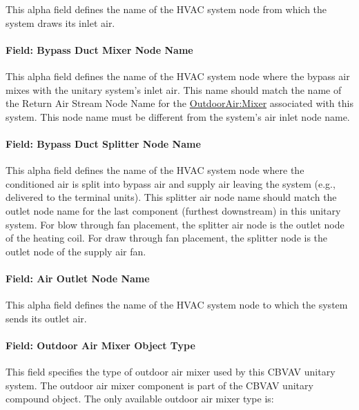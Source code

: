 This alpha field defines the name of the HVAC system node from which the system draws its inlet air.

\paragraph{Field: Bypass Duct Mixer Node Name}\label{field-bypass-duct-mixer-node-name}

This alpha field defines the name of the HVAC system node where the bypass air mixes with the unitary system's inlet air. This name should match the name of the Return Air Stream Node Name for the \hyperref[outdoorairmixer]{OutdoorAir:Mixer} associated with this system. This node name must be different from the system's air inlet node name.

\paragraph{Field: Bypass Duct Splitter Node Name}\label{field-bypass-duct-splitter-node-name}

This alpha field defines the name of the HVAC system node where the conditioned air is split into bypass air and supply air leaving the system (e.g., delivered to the terminal units). This splitter air node name should match the outlet node name for the last component (furthest downstream) in this unitary system. For blow through fan placement, the splitter air node is the outlet node of the heating coil. For draw through fan placement, the splitter node is the outlet node of the supply air fan.

\paragraph{Field: Air Outlet Node Name}\label{field-air-outlet-node-name-3-002}

This alpha field defines the name of the HVAC system node to which the system sends its outlet air.

\paragraph{Field: Outdoor Air Mixer Object Type}\label{field-outdoor-air-mixer-object-type}

This field specifies the type of outdoor air mixer used by this CBVAV unitary system. The outdoor air mixer component is part of the CBVAV unitary compound object. The only available outdoor air mixer type is:

